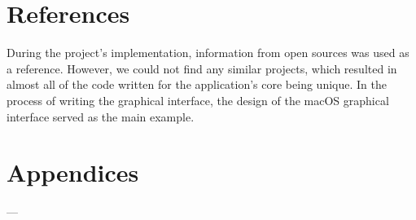 \documentclass{article}
\begin{document}
\section{References}
During the project's implementation, information from open sources was used as a reference. However, we could not find any similar projects, which resulted in almost all of the code written for the application's core being unique.
In the process of writing the graphical interface, the design of the macOS graphical interface served as the main example.

\section{Appendices}
---
\end{document}
